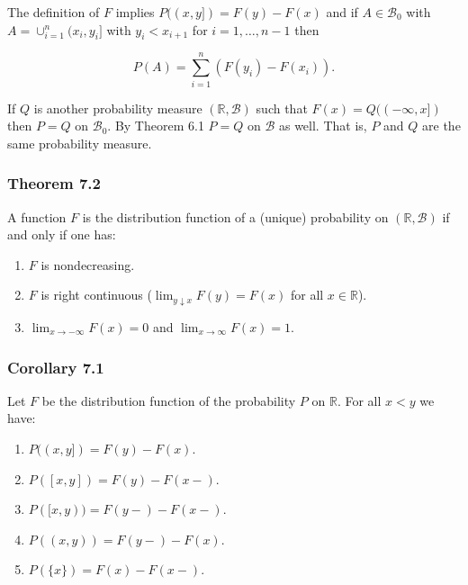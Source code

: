\documentclass{article}
\begin{document}
{The definition of $F$ implies $P((x,y]) = F(y) - F(x)$ and if $A \in \mathcal{B}_0$ with $A = \cup_{i=1}^n (x_i, y_i]$ with $y_i < x_{i+1}$ for $i=1,\dots , n-1$ then

$$
P(A) = \sum_{i=1}^n (F(y_i) - F(x_i)).
$$

If $Q$ is another probability measure $(\mathbb{R},\mathcal{B})$ such that $F(x) = Q((-\infty,x])$ then $P = Q$ on $\mathcal{B}_0$. By Theorem 6.1 $P = Q$ on $\mathcal{B}$ as well. That is, $P$ and $Q$ are the same probability measure. 

\subsubsection*{Theorem 7.2}

A function $F$ is the distribution function of a (unique) probability on $(\mathbb{R}, \mathcal{B})$ if and only if one has:

\begin{enumerate}
\item

$F$ is nondecreasing. 

\item

$F$ is right continuous ($\lim_{y\downarrow x} F(y) = F(x)$ for all $x \in \mathbb{R}$).

\item

$\lim_{x\rightarrow -\infty} F(x) = 0$ and $\lim_{x\rightarrow \infty} F(x) = 1$. 
\end{enumerate}

\subsubsection*{Corollary 7.1}

Let $F$ be the distribution function of the probability $P$  on $\mathbb{R}$. For all $x<y$ we have:

\begin{enumerate}
\item $P((x,y]) = F(y) - F(x)$.

\item $P([x,y]) = F(y) - F(x-)$.

\item $P([x,y)) = F(y-) - F(x-)$.

\item $P((x,y)) = F(y-) - F(x)$.

\item $P(\{x\}) = F(x) - F(x-)$. 


\end{enumerate}}
\end{document}
